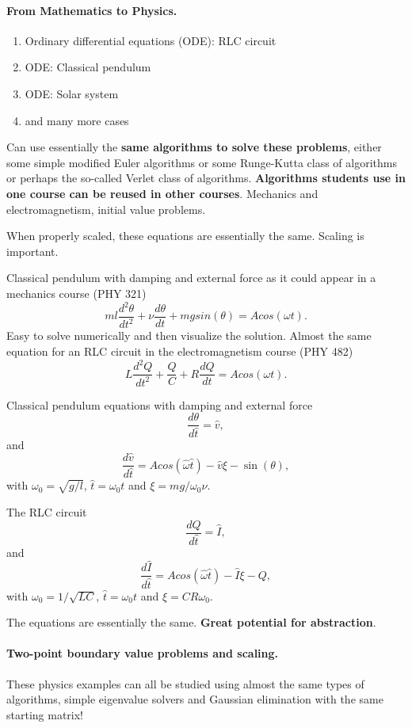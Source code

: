 \documentclass[graybox,envcountchap,sectrefs]{svmult}
\begin{document}
\noindent
\paragraph{From Mathematics to Physics.}
\begin{enumerate}
\item Ordinary differential equations (ODE): RLC circuit

\item ODE: Classical pendulum

\item ODE: Solar system

\item and many more cases
\end{enumerate}

\noindent
Can use essentially the \textbf{same algorithms to solve these problems}, either some simple modified Euler algorithms or some Runge-Kutta class of algorithms or perhaps the so-called Verlet class of algorithms.  \textbf{Algorithms students use in one course can be reused in other courses}.
Mechanics and electromagnetism, initial value problems.

When properly scaled, these equations are essentially the same. Scaling is important.

Classical pendulum with damping and external force as it could appear in a mechanics course (PHY 321)
\[
  ml\frac{d^2\theta}{dt^2}+\nu\frac{d\theta}{dt}  +mgsin(\theta)=Acos(\omega t).
\]
Easy to solve numerically and then visualize the solution.
Almost the same equation for an RLC circuit in the electromagnetism course (PHY 482)
\[
L\frac{d^2Q}{dt^2}+\frac{Q}{C}+R\frac{dQ}{dt}=Acos(\omega t).
\]

Classical pendulum equations with damping and external force
\[
   \frac{d\theta}{d\hat{t}} =\hat{v},
\]
and
\[
   \frac{d\hat{v}}{d\hat{t}} =Acos(\hat{\omega} \hat{t})-\hat{v}\xi-\sin(\theta),
\]
with $\omega_0=\sqrt{g/l}$, $\hat{t}=\omega_0 t$ and $\xi = mg/\omega_0\nu$.

The RLC circuit
\[
   \frac{dQ}{d\hat{t}} =\hat{I},
\]
and
\[
   \frac{d\hat{I}}{d\hat{t}} =Acos(\hat{\omega} \hat{t})-\hat{I}\xi-Q,
\]
with $\omega_0=1/\sqrt{LC}$, $\hat{t}=\omega_0 t$ and $\xi = CR\omega_0$.

The equations are essentially the same. \textbf{Great potential for abstraction}.

\paragraph{Two-point boundary value problems and scaling.}
These physics examples can all be studied using almost the same types of algorithms, simple eigenvalue solvers and Gaussian elimination with the same starting matrix!
\end{document}

